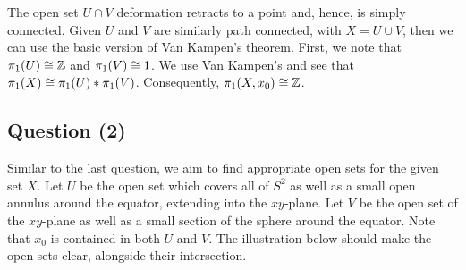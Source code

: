 \documentclass{article}
\begin{document}
\begin{flushleft}
    The open set $U \cap V$ deformation retracts to a point and, hence, is simply connected. Given $U$ and $V$ are similarly path connected, with $X = U \cup V$, then we can use the basic version of Van Kampen's theorem. First, we note that $\pi_1(U) \cong \mathbb{Z}$ and $\pi_1(V) \cong 1$. We use Van Kampen's and see that $\pi_1(X) \cong \pi_1(U) \ast \pi_1(V)$. Consequently, $\pi_1(X, x_0) \cong \mathbb{Z}$.
     
\end{flushleft}
\begin{center}
    \section*{Question (2)}
\end{center}

\begin{flushleft}
    Similar to the last question, we aim to find appropriate open sets for the given set $X$. Let $U$ be the open set which covers all of $S^2$ as well as a small open annulus around the equator, extending into the $xy$-plane. Let $V$ be the open set of the $xy$-plane as well as a small section of the sphere around the equator. Note that $x_0$ is contained in both $U$ and $V$. The illustration below should make the open sets clear, alongside their intersection. \newline 


\end{flushleft}
\end{document}

